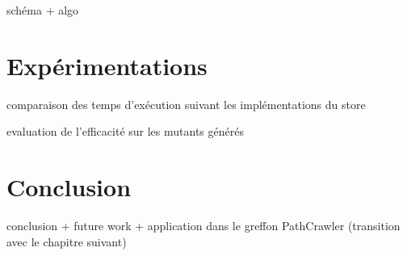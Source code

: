 schéma + algo




\section{Expérimentations}
comparaison des temps d'exécution suivant les implémentations du store

evaluation de l'efficacité sur les mutants générés





\section{Conclusion}
conclusion + future work + application dans le greffon PathCrawler (transition
avec le chapitre suivant)

